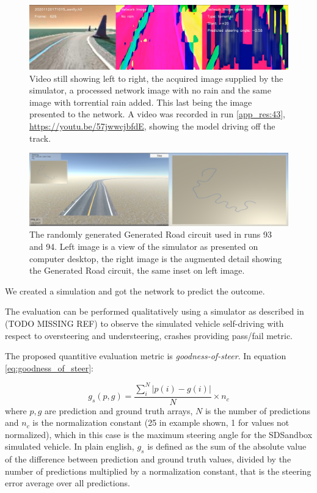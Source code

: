 \begin{figure}[htbp]
 \centering 
 \includegraphics[width=\textwidth]{Figures/tcpflow_Run43.png}
 \caption{Video still showing left to right, the acquired image supplied by the simulator, a processed network image with no rain and the same image with torrential rain added. This last being the image presented to the network. A video was recorded in run \ref{app_res:43}, \url{https://youtu.be/57jwwcjbfdE}, showing the model driving off the track.}
 \label{fig:tcpflow_Run43} 
\end{figure}


\begin{figure}[htbp]
 \centering 
 \includegraphics[width=\textwidth]{Figures/run-93-94-generated-road.png}
 \caption{The randomly generated Generated Road circuit used in runs 93 and 94. Left image is a view of the simulator as presented on computer desktop, the right image is the augmented detail showing the Generated Road circuit, the same inset on left image.}
 \label{fig:run-93-94-generated-road-res} 
\end{figure}

We created a simulation and got the network to predict the outcome.

The evaluation can be performed qualitatively using a simulator as described in (TODO MISSING REF) to observe the simulated vehicle self-driving with respect to oversteering and understeering, crashes providing pass/fail metric.

The proposed quantitive evaluation metric is \textit{goodness-of-steer}. In equation     \ref{eq:goodness_of_steer}:

\begin{equation}
    \label{eq:goodness_of_steer}
    g_s(p,g) = \frac{\sum_i^N \lvert p(i)-g(i) \rvert }{N} \times n_c
\end{equation}
where $p,g$ are prediction and ground truth arrays,  $N$ is the number of predictions and $n_c$ is the normalization constant (25 in example shown, 1 for values not normalized), which in this case is the maximum steering angle for the SDSandbox simulated vehicle. In plain english, $g_s$ is defined as the sum of the absolute value of the difference between prediction and ground truth values, divided by the number of predictions multiplied by a normalization constant, that is the steering error average over all predictions. 